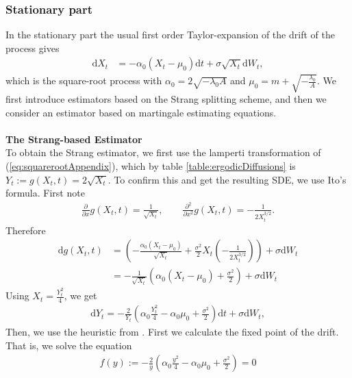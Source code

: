 \subsubsection{Stationary part}\label{subsubsec:squarerootStationary}
In the stationary part the usual first order Taylor-expansion of the drift of the process gives
\begin{align}
    \mathrm{d}X_t &= -\alpha_0\left(X_t - \mu_0\right)\mathrm{d}t + \sigma \sqrt{X_t} \mathrm{d}W_t, \label{eq:squarerootAppendix}
\end{align}
which is the square-root process with $\alpha_0 = 2\sqrt{-\lambda_0A}$ and $\mu_0 = m + \sqrt{-\frac{\lambda_0}{A}}$. 
We first introduce estimators based on the Strang splitting scheme, and then we consider an estimator based on martingale estimating equations.\\\\
\noindent \textbf{The Strang-based Estimator}\\
To obtain the Strang estimator, we first use the lamperti transformation of (\ref{eq:squarerootAppendix}), which by table \ref{table:ergodicDiffusions} is $Y_t := g(X_t, t) = 2\sqrt{X_t}$. To confirm this and get the resulting SDE, we use Ito's formula. First note
\begin{align}
    \frac{\partial}{\partial x}g(X_t, t) = \frac{1}{\sqrt{X_t}}, \qquad \frac{\partial^2}{\partial x^2}g(X_t, t) = - \frac{1}{2X_t^{3/2}}.
\end{align}
Therefore
\begin{align}
    \mathrm{d}g(X_t, t) &= \left(-\frac{\alpha_0\left(X_t - \mu_0\right)}{\sqrt{X_t}} + \frac{\sigma^2}{2}X_t \left(-\frac{1}{2X_t^{3/2}}\right)\right) + \sigma\mathrm{d}W_t \nonumber \\
    &= -\frac{1}{\sqrt{X_t}}\left(\alpha_0\left(X_t - \mu_0\right) + \frac{\sigma^2}{2}\right) + \sigma\mathrm{d}W_t
\end{align}
Using $X_t = \frac{Y_t^2}{4}$, we get
\begin{align}
    \mathrm{d}Y_t = - \frac{2}{Y_t}\left(\alpha_0 \frac{Y_t^2}{4} - \alpha_0 \mu_0 + \frac{\sigma^2}{2}\right)\mathrm{d}t + \sigma \mathrm{d}W_t, \label{eq:lampertiSquarerootAppendix}
\end{align}
Then, we use the heuristic from \cite[section 2.3 and 2.5]{SplittingSchemes}. First we calculate the fixed point of the drift. That is, we solve the equation
\begin{align}
    f(y) := - \frac{2}{y}\left(\alpha_0 \frac{y^2}{4} - \alpha_0 \mu_0 + \frac{\sigma^2}{2}\right) = 0
\end{align}
